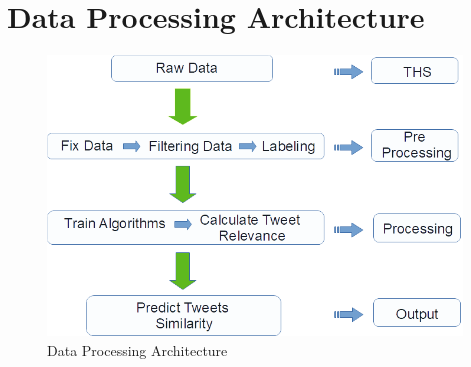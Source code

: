 \documentclass[12pt]{report}
\begin{document}
%
%

\section{Data Processing Architecture}

\begin{figure}[H]	
	\centering
	\includegraphics[width=110mm, scale = 1]{images/5_data_processing.png}	
	\caption{Data Processing Architecture}	
	\label{figure:data_processing}
\end{figure}
\end{document}
